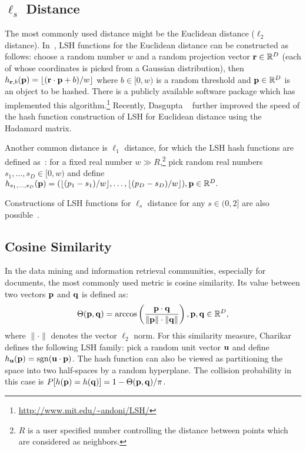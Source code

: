 \subsection{ $\ell_s $ Distance}

The most commonly used distance might be the Euclidean distance (\aka $\ell_2 $ distance). In~\cite{datar2004scg}, \mbox{LSH} functions for the Euclidean distance can be constructed as follows: choose a random number $w$ and a random projection vector ${\bf r}\in \mathbb{R}^D$ (each of whose coordinates is picked from a Gaussian distribution), then $h_{{\bf r},b}({\bf p}) = \lfloor({\bf r}\cdot {\bf p}+b)/w\rfloor$ where $b\in[0,w)$ is a random threshold and ${\bf p}\in\mathbb{R}^D$ is an object to be hashed. There is a publicly available software package which has implemented this algorithm.\footnote{\url{http://www.mit.edu/~andoni/LSH/}} Recently, Dasgupta \etal~\cite{dasgupta2011kdd} further improved the speed of the hash function construction of \mbox{LSH} for Euclidean distance using the Hadamard matrix.

Another common distance is $ \ell_1 $ distance, for which the \mbox{LSH} hash functions are defined as~\cite{andoni2006soda}: for a fixed real number $w\gg R$,\footnote{$ R $ is a user specified number controlling the distance between points which are considered as neighbors.} pick random real numbers $s_1,\dots,s_D\in[0,w)$ and define $h_{s_1,\dots,s_D}({\bf p}) = (\lfloor(p_1-s_1)/w\rfloor,\dots,\lfloor(p_D-s_D)/w\rfloor),{\bf p}\in\mathbb{R}^D.$  

Constructions of \mbox{LSH} functions for $ \ell_s $ distance for any $ s\in(0,2] $ are also possible~\cite{datar2004scg}. 




\subsection{Cosine Similarity}

In the data mining and information retrieval communities, especially for documents, the most commonly used metric is cosine similarity. Its value between two vectors $ {\bf p}  $ and $ {\bf q}  $ is defined as:
$$\Theta({\bf p},{\bf q}) = \arccos\left(\frac{{\bf p}\cdot {\bf q}}{\|{\bf p}\|\cdot\|{\bf q}\|}\right),{\bf p},{\bf q}\in\mathbb{R}^{D},$$ where $\|\cdot\|$ denotes the vector $\ell_2$ norm. For this similarity measure, Charikar \etal~\cite{charikar2002stoc} defines the following LSH family: pick a random unit vector ${\bf u}$ and define $h_{{\bf u}}({\bf p}) = \mathop{\rm sgn}({\bf u}\cdot {\bf p})$. The hash function can also be viewed as partitioning the space into two half-spaces by a random hyperplane. The collision probability in this case is $ P[h({\bf p} )=h({\bf q} )] = 1-\Theta({\bf p} ,{\bf q} )/\pi $.

